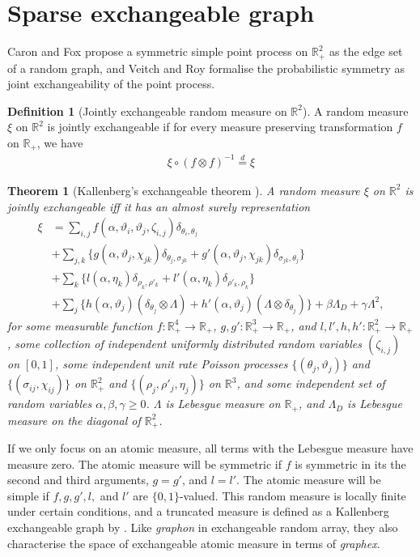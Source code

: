 \documentclass{article}
\newtheorem{theorem}{Theorem} %
\theoremstyle{definition}
\newtheorem{definition}{Definition}
\begin{document}
\section{Sparse exchangeable graph}
Caron and Fox propose a symmetric simple point process on $\mathbb{R}^2_+$ as the edge set of a random graph, and Veitch and Roy formalise the probabilistic symmetry as joint exchangeability of the point process.
\begin{definition}[Jointly exchangeable random measure on $\mathbb{R}^2$] A random measure $\xi$ on $\mathbb{R}^2$ is jointly exchangeable if for every measure preserving transformation $f$ on $\mathbb{R}_+$, we have
\begin{align}
\xi \circ (f \otimes f)^{-1} \stackrel{d}{=} \xi
\end{align}
\end{definition}
\begin{theorem}[Kallenberg's exchangeable theorem \citep{Kallenberg1990,kallenberg2005probabilistic}] A random measure $\xi$ on $\mathbb{R}^2$ is jointly exchangeable iff it has an almost surely representation
\begin{align}
\xi &= \sum_{i,j} f(\alpha, \vartheta_i, \vartheta_j, \zeta_{i,j})\delta_{\theta_i, \theta_j} \\
&+ \sum_{j,k}\{g(\alpha, \vartheta_j, \chi_{jk})\delta_{\theta_j,\sigma_{jk}} + g'(\alpha, \vartheta_j, \chi_{jk})\delta_{\sigma_{jk},\theta_j}\}\\
&+ \sum_{k}\{l(\alpha, \eta_k)\delta_{\rho_k,\rho'_k} + l'(\alpha, \eta_k)\delta_{\rho'_k, \rho_k}\}\\
&+\sum_j\{h(\alpha, \vartheta_j)(\delta_{\theta_j} \otimes \Lambda) + h'(\alpha, \vartheta_j)(\Lambda \otimes \delta_{\theta_j})\} + \beta\Lambda_D + \gamma \Lambda^2,
\end{align}
for some measurable function $f:\mathbb{R}_+^4 \rightarrow \mathbb{R}_+$, $g,g':\mathbb{R}_+^3 \rightarrow \mathbb{R}_+$, and $l, l', h, h': \mathbb{R}_+^2\rightarrow\mathbb{R}_+$, some collection of independent uniformly distributed random variables $(\zeta_{i,j})$ on $[0,1]$, some independent unit rate Poisson processes $\{(\theta_j, \vartheta_j)\}$ and $\{(\sigma_{ij}, \chi_{ij})\}$ on $\mathbb{R}_+^2$ and $\{(\rho_j, \rho'_j, \eta_j)\}$ on $\mathbb{R}^3$, and some independent set of random variables $\alpha, \beta, \gamma \geq 0$. $\Lambda$ is Lebesgue measure on $\mathbb{R}_+$, and $\Lambda_D$ is Lebesgue measure on the diagonal of $\mathbb{R}_+^2$.
\end{theorem}
If we only focus on an atomic measure, all terms with the Lebesgue measure have measure zero. The atomic measure will be symmetric if $f$ is symmetric in its the second and third arguments, $g = g'$, and $l=l'$. The atomic measure will be simple if $f, g, g', l,$ and $l'$ are $\{0,1\}$-valued. This random measure is locally finite under certain conditions, and a truncated measure is defined as a Kallenberg exchangeable graph by \cite{Veitch2015}. Like \textit{graphon} in exchangeable random array, they also characterise the space of exchangeable atomic measure in terms of \textit{graphex}.
\end{document}

